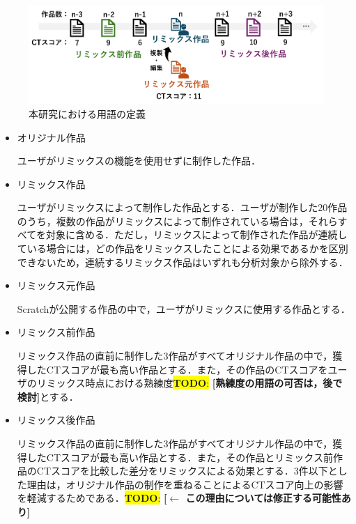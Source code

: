 \documentclass[submit,techrep,noauthor]{ipsj}
\newcommand{\todo}[1]{\colorbox{yellow}{{\bf TODO}:}{\color{red} {\textbf{[#1]}}}}
\begin{document}
\begin{figure}[h]
  \centering
  \includegraphics[width=\linewidth]{@IPSJ_SIGSE202511_Horio/fig/teigi.pdf}
  \caption{本研究における用語の定義}
  \label{teigi}
\end{figure}

\begin{itemize}
    \item オリジナル作品
  
    ユーザがリミックスの機能を使用せずに制作した作品．

    \item リミックス作品

    ユーザがリミックスによって制作した作品とする．ユーザが制作した20作品のうち，複数の作品がリミックスによって制作されている場合は，それらすべてを対象に含める．ただし，リミックスによって制作された作品が連続している場合には，どの作品をリミックスしたことによる効果であるかを区別できないため，連続するリミックス作品はいずれも分析対象から除外する．
     
    \item リミックス元作品

    Scratchが公開する作品の中で，ユーザがリミックスに使用する作品とする．
    
    \item リミックス前作品
  
    リミックス作品の直前に制作した3作品がすべてオリジナル作品の中で，獲得したCTスコアが最も高い作品とする．また，その作品のCTスコアをユーザのリミックス時点における熟練度\todo{熟練度の用語の可否は，後で検討}とする．

    \item リミックス後作品
  
    リミックス作品の直前に制作した3作品がすべてオリジナル作品の中で，獲得したCTスコアが最も高い作品とする．また，その作品とリミックス前作品のCTスコアを比較した差分をリミックスによる効果とする．3件以下とした理由は，オリジナル作品の制作を重ねることによるCTスコア向上の影響を軽減するためである．\todo{$\leftarrow$ この理由については修正する可能性あり}
\end{itemize}
\end{document}
